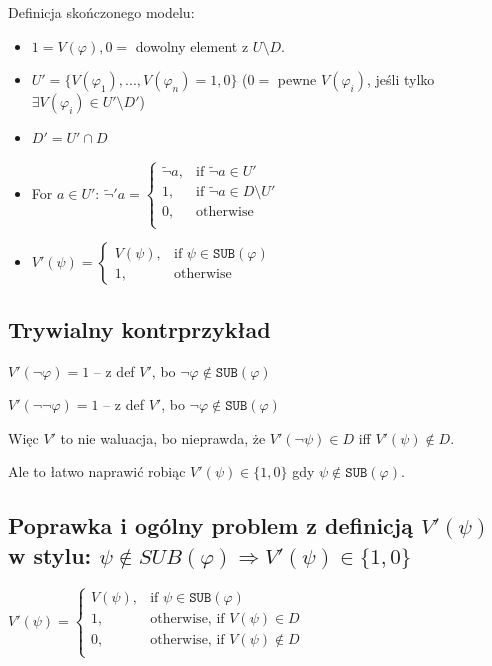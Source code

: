 \documentclass{article}
\theoremstyle{definition}
\theoremstyle{definition}
\theoremstyle{definition}
\newcommand*{\SUB}{\texttt{SUB}}
\begin{document}
Definicja skończonego modelu:
\begin{itemize}
  \item $1 = V(\varphi), 0 = $ dowolny element z $U \setminus D$.
  \item $U' = \{V(\varphi_1), ..., V(\varphi_n) = 1, 0\}$ ($0 = $ pewne $ V(\varphi_i)$, jeśli tylko $\exists V(\varphi_i) \in U'\setminus D'$)
  \item $D' = U' \cap D$
  \item For $a \in U'$: $ \tilde{\lnot}'a = \begin{cases}
            \tilde{\lnot}a , & \text{if } \tilde{\lnot}a \in U'              \\
            1,               & \text{if } \tilde{\lnot} a \in D \setminus U' \\
            0,               & \text{otherwise }                             \\
          \end{cases}
        $
  \item $V'(\psi) = \begin{cases}
            V(\psi) , & \text{if } \psi \in \SUB(\varphi) \\
            1,        & \text{otherwise }
          \end{cases}$
\end{itemize}

\subsection*{Trywialny kontrprzykład}

$V'(\lnot \varphi) = 1$ -- z def $V'$, bo $\lnot \varphi \not \in \SUB(\varphi)$

$V'(\lnot \lnot \varphi) = 1$ -- z def $V'$, bo $\lnot \varphi \not \in \SUB(\varphi)$

Więc $V'$ to nie waluacja, bo nieprawda, że $V'(\lnot \psi) \in D$ iff
$V'(\psi) \not \in D$.

Ale to łatwo naprawić robiąc $V'(\psi) \in \{1, 0\}$ gdy $\psi \not \in
  \SUB(\varphi)$.

\subsection*{Poprawka i ogólny problem z definicją $V'(\psi)$ w stylu: $\psi \not \in SUB(\varphi) \Rightarrow V'(\psi) \in \{1, 0\}$}

$V'(\psi) = \begin{cases}
    V(\psi) , & \text{if } \psi \in \SUB(\varphi)        \\
    1,        & \text{otherwise, if } V(\psi) \in D      \\
    0,        & \text{otherwise, if } V(\psi) \not \in D \\
  \end{cases}$
\end{document}
